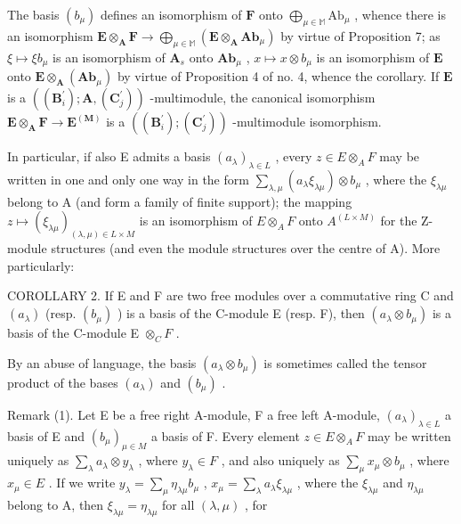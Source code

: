 The basis \((b_{\mu})\) defines an isomorphism of \(\mathbf{F}\) onto \(\bigoplus_{\mu \in \mathbb{M}}\mathrm{Ab}_{\mu}\) , whence there is an isomorphism \(\mathbf{E} \otimes_{\mathbf{A}}\mathbf{F} \to \bigoplus_{\mu \in \mathbb{M}}(\mathbf{E} \otimes_{\mathbf{A}}\mathbf{Ab}_{\mu})\) by virtue of Proposition 7; as \(\xi \mapsto \xi b_{\mu}\) is an isomorphism of \(\mathbf{A}_s\) onto \(\mathbf{Ab}_{\mu}\) , \(x \mapsto x \otimes b_{\mu}\) is an isomorphism of \(\mathbf{E}\) onto \(\mathbf{E} \otimes_{\mathbf{A}} (\mathbf{Ab}_{\mu})\) by virtue of Proposition 4 of no. 4, whence the corollary. If \(\mathbf{E}\) is a \(((\mathbf{B}_i^{\prime}); \mathbf{A}, (\mathbf{C}_j^{\prime}))\) -multimodule, the canonical isomorphism \(\mathbf{E} \otimes_{\mathbf{A}} \mathbf{F} \to \mathbf{E}^{(\mathbf{M})}\) is a \(((\mathbf{B}_i^{\prime}); (\mathbf{C}_j^{\prime}))\) -multimodule isomorphism.

In particular, if also E admits a basis \((a_{\lambda})_{\lambda \in L}\) , every \(z \in E \otimes_{A} F\) may be written in one and only one way in the form \(\sum_{\lambda, \mu} (a_{\lambda} \xi_{\lambda \mu}) \otimes b_{\mu}\) , where the \(\xi_{\lambda \mu}\) belong to A (and form a family of finite support); the mapping \(z \mapsto (\xi_{\lambda \mu})_{(\lambda, \mu) \in L \times M}\) is an isomorphism of \(E \otimes_{A} F\) onto \(A^{(L \times M)}\) for the Z-module structures (and even the module structures over the centre of A). More particularly:

COROLLARY 2. If E and F are two free modules over a commutative ring C and \((a_{\lambda})\) (resp. \((b_{\mu})\) ) is a basis of the C-module E (resp. F), then \((a_{\lambda} \otimes b_{\mu})\) is a basis of the C-module E \(\otimes_{C} F\) .

By an abuse of language, the basis \((a_{\lambda} \otimes b_{\mu})\) is sometimes called the tensor product of the bases \((a_{\lambda})\) and \((b_{\mu})\) .

Remark (1). Let E be a free right A-module, F a free left A-module, \((a_{\lambda})_{\lambda \in L}\) a basis of E and \((b_{\mu})_{\mu \in M}\) a basis of F. Every element \(z \in E \otimes_{A} F\) may be written uniquely as \(\sum_{\lambda} a_{\lambda} \otimes y_{\lambda}\) , where \(y_{\lambda} \in F\) , and also uniquely as \(\sum_{\mu} x_{\mu} \otimes b_{\mu}\) , where \(x_{\mu} \in E\) . If we write \(y_{\lambda} = \sum_{\mu} \eta_{\lambda \mu} b_{\mu}\) , \(x_{\mu} = \sum_{\lambda} a_{\lambda} \xi_{\lambda \mu}\) , where the \(\xi_{\lambda \mu}\) and \(\eta_{\lambda \mu}\) belong to A, then \(\xi_{\lambda \mu} = \eta_{\lambda \mu}\) for all \((\lambda, \mu)\) , for

